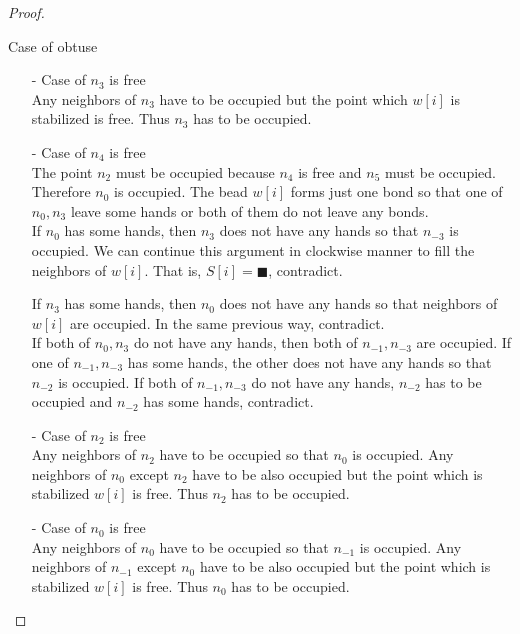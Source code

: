 \begin{proof}
\begin{paragraph}{Case of obtuse}
\begin{itemize}
\item[-] Case of $n_3$ is free\\
Any neighbors of $n_3$ have to be occupied but the point which $w[i]$ is stabilized is free. Thus $n_3$ has to be occupied.
\item[-] Case of $n_4$ is free\\
The point $n_2$ must be occupied because $n_4$ is free and $n_5$ must be occupied.
Therefore $n_0$ is occupied.
The bead $w[i]$ forms just one bond so that one of $n_0, n_3$ leave some hands or both of them do not leave any bonds.\\
If $n_0$ has some hands, then $n_3$ does not have any hands so that $n_{-3}$ is occupied. 
We can continue this argument in clockwise manner to fill the neighbors of $w[i]$.
That is, $S[i] = \blacksquare$, contradict.

If $n_3$ has some hands, then $n_0$ does not have any hands so that neighbors of $w[i]$ are occupied. In the same previous way, contradict.\\
If both of $n_0, n_3$ do not have any hands, then both of $n_{-1}, n_{-3}$ are occupied. If one of $n_{-1}, n_{-3}$ has some hands, the other does not have any hands so that $n_{-2}$ is occupied. If both of $n_{-1}, n_{-3}$ do not have any hands, $n_{-2}$ has to be occupied and $n_{-2}$ has some hands, contradict.
\item[-] Case of $n_2$ is free\\
Any neighbors of $n_2$ have to be occupied so that $n_0$ is occupied. Any neighbors of $n_0$ except $n_2$ have to be also occupied but the point which is stabilized $w[i]$ is free. Thus $n_2$ has to be occupied.
\item[-] Case of $n_0$ is free\\
Any neighbors of $n_0$ have to be occupied so that $n_{-1}$ is occupied. Any neighbors of $n_{-1}$ except $n_0$ have to be also occupied but the point which is stabilized $w[i]$ is free. Thus $n_0$ has to be occupied. 
\end{itemize}
\end{paragraph}




\end{proof}
